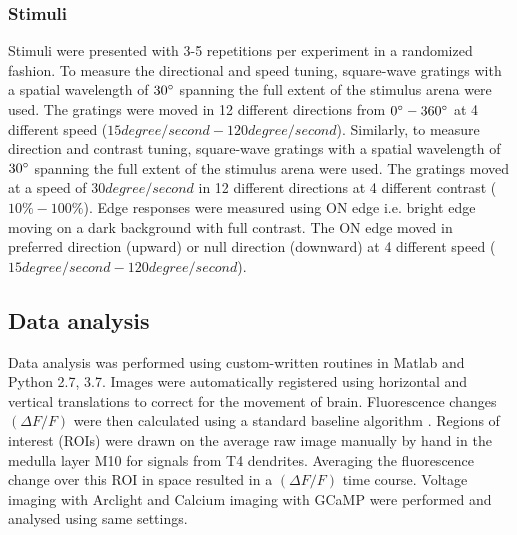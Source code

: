 \documentclass[9pt,lineno]{elife}
\begin{document}
\subsubsection{Stimuli}
Stimuli were presented with 3-5 repetitions per experiment in a randomized fashion. To measure the directional and speed tuning, square-wave gratings with a spatial wavelength of $30\degree$ spanning the full extent of the stimulus arena were used. The gratings were moved in 12 different directions from $0\degree - 360\degree$ at 4 different speed ($15degree/second - 120degree/second$). Similarly, to measure direction and contrast tuning, square-wave gratings with a spatial wavelength of $30\degree$ spanning the full extent of the stimulus arena were used. The gratings moved at a speed of $30degree/second$ in 12 different directions at 4 different contrast ($10\% - 100\%$). Edge responses were measured using ON edge i.e. bright edge moving on a dark background with full contrast. The ON edge moved in preferred direction (upward) or null direction (downward) at 4 different speed ($15degree/second - 120degree/second$).

\subsection{Data analysis}
Data analysis was performed using custom-written routines in Matlab and Python 2.7, 3.7. Images were automatically registered using horizontal and vertical translations to correct for the movement of brain. Fluorescence changes $(\Delta F/F)$ were then calculated using a standard baseline algorithm \parencite{Jia2010}. Regions of interest (ROIs) were drawn on the average raw image manually by hand in the medulla layer M10 for signals from T4 dendrites. Averaging the fluorescence change over this ROI in space resulted in a $(\Delta F/F)$ time course. Voltage imaging with Arclight and Calcium imaging with GCaMP were performed and analysed using same settings.

\printbibliography[heading=bibintoc]
\end{document}

